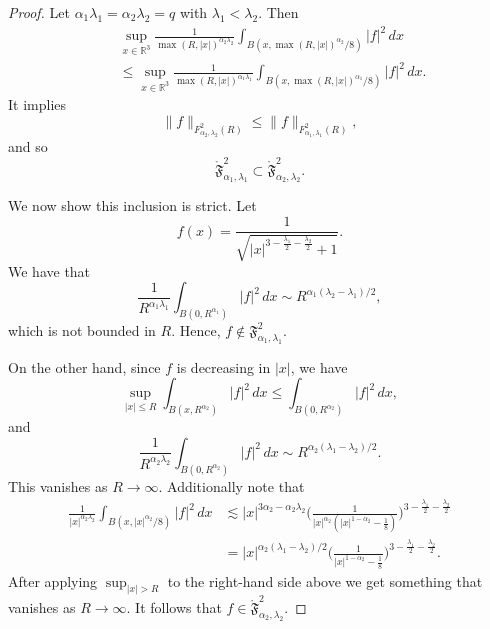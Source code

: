 \documentclass[11pt]{article}
\numberwithin{equation}{section}
\theoremstyle{remark}
\theoremstyle{definition}
\newcommand{\R}{\mathbb{R}}
\newcommand\al{\alpha}
\newcommand\la{\lambda}
\newcommand{\I}{\infty}
\newcommand{\EQN}[1]{\begin{equation*}\begin{split} #1 \end{split}\end{equation*}}
\begin{document}
\begin{proof}

Let $\al_1\la_1=\al_2\la_2=q$ with $\la_1 < \la_2$. Then
\EQN{
&\sup_{x\in \R^3} \frac 1 {\max(R ,|x| )^{\al_2\la_2 }}  \int_{B(x, \max(R,|x|)^{\al_2}/8  )} |f|^2\,dx \\\quad &\leq \sup_{x\in \R^3} \frac 1 {\max(R ,|x| )^{\al_1\la_1 }} \int_{B(x, \max(R,|x|)^{\al_1}/8)} |f|^2\,dx.
}
It implies
\[
\| f\|_{F^{2}_{\al_2,\la_2} (R)}\leq \| f\|_{F^{2}_{\al_1,\la_1} (R)},
\]
and so
\[
\mathring {\mathfrak F}^{2}_{\al_1,\la_1}\subset \mathring {\mathfrak F}^{2}_{\al_2,\la_2}.
\]

We now show this inclusion is strict. Let
\[
f(x) = \frac 1 { \sqrt{   |x|^{3- \frac {\la_1} 2 -\frac {\la_2}2 } +1  }   }.
\]
We have that
\[
\frac 1 {R^{\al_1\la_1}} \int_{B(0,R^{\al_1})} |f|^2\,dx \sim R^{\al_1(\la_2-\la_1)/2},
\]
which is not bounded in $R$. Hence, $f\notin   {\mathfrak F}^{2}_{\al_1,\la_1}$.


On the other hand, since $f$ is decreasing in $|x|$,   we have
\[
\sup_{|x|\leq R} \int_{B(x,R^{\al_2})}|f|^2\,dx \leq \int_{B(0,R^{\al_2})} |f|^2\,dx,
\]
and
\[
\frac 1 {R^{\al_2\la_2}} \int_{B(0,R^{\al_2})} |f|^2\,dx \sim R^{\al_2(\la_1-\la_2)/2}.
\]
This vanishes as $R\to \I$.
Additionally note that \EQN{
\frac 1 {|x|^{\al_2 \la_2 }} \int_{B(x,|x|^{\al_2}/8)}|f|^2 \,dx&\lesssim |x|^{3\al_2       -\al_2\la_2 } \bigg(\frac 1 { |x|^{\al_2} (|x|^{1-\al_2} - \frac 1 8)  } \bigg)^{3- \frac {\la_1} 2 - \frac {\la_2} 2 }
\\&=|x|^{  \al_2( \la_1- \la_2)/2}\bigg(	\frac 1 {|x|^{1-\al_2} -\frac 1 8}\bigg)^{3- \frac {\la_1} 2 - \frac {\la_2} 2}.
}
After applying  $\sup_{|x|>R}$ to the right-hand side above we get something that vanishes as $R\to \I$. It follows that $f\in \mathring {\mathfrak F}^{2}_{\al_2,\la_2}$.
\end{proof}
\end{document}

